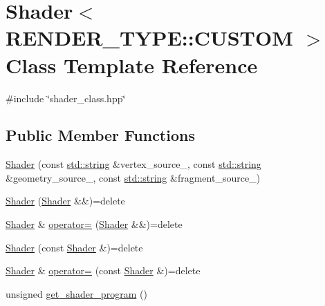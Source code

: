 \hypertarget{classShader_3_01RENDER__TYPE_1_1CUSTOM_01_4}{}\section{Shader$<$ R\+E\+N\+D\+E\+R\+\_\+\+T\+Y\+PE\+:\+:C\+U\+S\+T\+OM $>$ Class Template Reference}
\label{classShader_3_01RENDER__TYPE_1_1CUSTOM_01_4}


{\ttfamily \#include \char`\"{}shader\+\_\+class.\+hpp\char`\"{}}

\subsection*{Public Member Functions}
\begin{DoxyCompactItemize}
\item 
\mbox{\hyperlink{classShader_3_01RENDER__TYPE_1_1CUSTOM_01_4_a8238c3e1a3a96e7ed2b1777a340d7947}{Shader}} (const \mbox{\hyperlink{glad_8h_ac83513893df92266f79a515488701770}{std\+::string}} \&vertex\+\_\+source\+\_\+, const \mbox{\hyperlink{glad_8h_ac83513893df92266f79a515488701770}{std\+::string}} \&geometry\+\_\+source\+\_\+, const \mbox{\hyperlink{glad_8h_ac83513893df92266f79a515488701770}{std\+::string}} \&fragment\+\_\+source\+\_\+)
\item 
\mbox{\hyperlink{classShader_3_01RENDER__TYPE_1_1CUSTOM_01_4_a4fea53201befd8962702645fe8f2526e}{Shader}} (\mbox{\hyperlink{classShader}{Shader}} \&\&)=delete
\item 
\mbox{\hyperlink{classShader}{Shader}} \& \mbox{\hyperlink{classShader_3_01RENDER__TYPE_1_1CUSTOM_01_4_a717f92caab16604933920257707046b6}{operator=}} (\mbox{\hyperlink{classShader}{Shader}} \&\&)=delete
\item 
\mbox{\hyperlink{classShader_3_01RENDER__TYPE_1_1CUSTOM_01_4_af1fbc8b0cb20d1af7905e2d896f0fb79}{Shader}} (const \mbox{\hyperlink{classShader}{Shader}} \&)=delete
\item 
\mbox{\hyperlink{classShader}{Shader}} \& \mbox{\hyperlink{classShader_3_01RENDER__TYPE_1_1CUSTOM_01_4_a44af437f5ea044824ba7937ee07d1da7}{operator=}} (const \mbox{\hyperlink{classShader}{Shader}} \&)=delete
\item 
unsigned \mbox{\hyperlink{classShader_3_01RENDER__TYPE_1_1CUSTOM_01_4_adf4d1f7a937d11102268dfb8fc7f2f9e}{get\+\_\+shader\+\_\+program}} ()
\end{DoxyCompactItemize}
